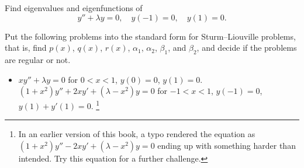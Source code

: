 \documentclass{ximera}
\begin{document}

\begin{exercise}
    Find eigenvalues and eigenfunctions of
    \begin{equation*}
        y'' + \lambda y = 0, \quad y(-1) = 0, \quad y(1) = 0 .
    \end{equation*}
\end{exercise}

\begin{exercise}
    Put the following problems into the standard form for Sturm--Liouville problems, that is, find $p(x)$, $q(x)$, $r(x)$, $\alpha_1$, $\alpha_2$, $\beta_1$, and $\beta_2$, and decide if the problems are regular or not.
    \begin{itemize}
    \item $x y'' + \lambda y = 0$ \enspace for $0 < x < 1$, \enspace $y(0) = 0$, \enspace $y(1) = 0$.
    $(1+x^2) y'' + 2xy' + (\lambda-x^2) y = 0$ \enspace for $-1 < x < 1$, \enspace $y(-1) = 0$, \enspace $y(1)+y'(1) = 0$.%
        \footnote{%
            In an earlier version of this book, a typo rendered the equation as $(1+x^2) y'' - 2xy' + (\lambda-x^2) y = 0$ ending up with something harder than intended.  Try this equation for a further challenge.
            }
    \end{itemize}
\end{exercise}
\end{document}
